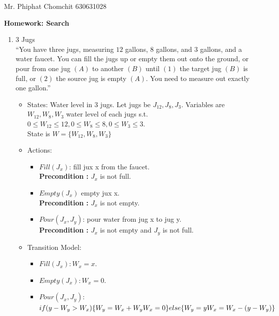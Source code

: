 \documentclass[12pt, a4paper]{article}
\begin{document}
	Mr. Phiphat Chomchit 630631028
	\begin{center}
		\textbf{Homework: Search}
	\end{center}
	
	\begin{enumerate}
		\item 3 Jugs\\
		 “You have three jugs, measuring $12$ gallons, $8$ gallons, and $3$ gallons, and a water faucet.  You can fill the jugs up or empty them out onto the ground, or pour from one jug $(A)$ to another $(B)$ until $(1)$ the target jug $(B)$ is full, or $(2)$ the source jug is empty $(A)$. You need to measure out exactly one gallon.”
		
		\begin{itemize}
			\item States: Water level in 3 jugs. Let jugs be $J_{12}, J_{8}, J_{3}$. Variables are $W_{12}, W_{8}, W_{3}$ water level of each jugs s.t.\\   $0 \leq W_{12} \leq 12, 0 \leq W_{8} \leq 8, 0 \leq  W_{3} \leq 3$. \\ State is $W = \{W_12, W_8, W_3\}$
			
			\item Actions:
			\begin{itemize}
				\item $Fill(J_x)$: fill jux x from the faucet.\\ \textbf{Precondition :} $J_x$ is not full.
				
				\item $Empty(J_x)$ empty jux x.\\
				\textbf{Precondition :} $J_x$ is not empty.
				
				\item $Pour(J_x, J_y)$: pour water from jug x to jug y.\\
				\textbf{Precondition :} $J_x$ is not empty and $J_y$ is not full.
			\end{itemize}
		\item Transition Model:
		\begin{itemize}
			\item $Fill(J_x): W_x = x$.
			\item $Empty(J_x): W_x = 0$.
			\item $Pour(J_x, J_y):$\\
			$if (y - W_y > W_x)\{\\
			 W_y = W_x + W_y\\
			W_x = 0\\
			\} else\{\\
			W_y = y\\
			W_x = W_x - (y - W_y)
			\}$
			

\end{itemize}
\end{itemize}
\end{enumerate}
\end{document}
